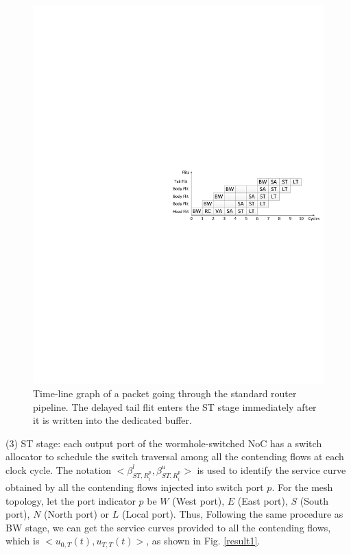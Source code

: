\documentclass[preprint]{elsarticle}
\begin{document}
\begin{figure}
  \centering
  \includegraphics[scale=0.35]{figures/Pipeline.pdf}
  \caption{Time-line graph of a packet going through the standard router pipeline. The delayed tail flit enters the ST stage immediately after it is written into the dedicated buffer.}\label{pipeline}
\end{figure}

(3) ST stage: each output port of the wormhole-switched NoC has a switch allocator to schedule the switch traversal among all the contending flows at each clock cycle. The notation $<\beta_{ST,R_i^{p}}^l,\beta_{ST,R_i^{p}}^u>$ is used to identify the service curve obtained by all the contending flows injected into switch port $p$. For the mesh topology, let the port indicator $p$ be $W$ (West port), $E$ (East port), $S$ (South port), $N$ (North port) or $L$ (Local port). Thus, Following the same procedure as BW stage, we can get the service curves provided to all the contending flows, which is $<u_{0,T}(t),u_{T,T}(t)>$, as shown in Fig. \ref{result1}.
\end{document}
